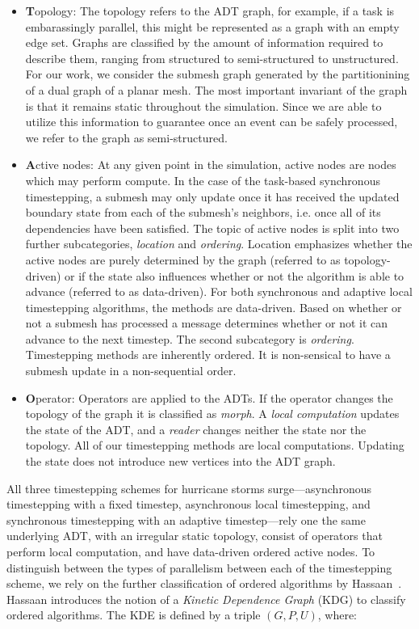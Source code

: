 \begin{itemize}
\item {\bf T}opology: The topology refers to the ADT graph, for example, if a task is embarassingly parallel, this might be represented as a graph with an empty edge set. Graphs are classified by the amount of information required to describe them, ranging from structured to semi-structured to unstructured. For our work, we consider the submesh graph generated by the partitionining of a dual graph of a planar mesh. The most important invariant of the graph is that it remains static throughout the simulation. Since we are able to utilize this information to guarantee once an event can be safely processed, we refer to the graph as semi-structured.
\item {\bf A}ctive nodes: At any given point in the simulation, active nodes are nodes which may perform  compute. In the case of the task-based synchronous timestepping, a submesh may only update once it has received the updated boundary state from each of the submesh's neighbors, i.e. once all of its dependencies have been satisfied. The topic of active nodes is split into two further subcategories, {\em location} and {\em ordering}. Location emphasizes whether the active nodes are purely determined by the graph (referred to as topology-driven) or if the state also influences whether or not the algorithm is able to advance (referred to as data-driven). For both synchronous and adaptive local timestepping algorithms, the methods are data-driven. Based on whether or not a submesh has processed a message determines whether or not it can advance to the next timestep. The second subcategory is {\em ordering}. Timestepping methods are inherently ordered. It is non-sensical to have a submesh update in a non-sequential order.
\item {\bf O}perator: Operators are applied to the ADTs. If the operator changes the topology of the graph it is classified as {\em morph}. A {\em local computation} updates the state of the ADT, and a {\em reader} changes neither the state nor the topology. All of our timestepping methods are local computations. Updating the state does not introduce new vertices into the ADT graph.
\end{itemize}
All three timestepping schemes for hurricane storms surge---asynchronous timestepping with a fixed timestep, asynchronous local timestepping, and synchronous timestepping with an adaptive timestep---rely one the same underlying ADT, with an irregular static topology, consist of operators that perform local computation, and have data-driven ordered active nodes. To distinguish between the types of parallelism between each of the timestepping scheme, we rely on the further classification of ordered algorithms by Hassaan~\cite{Hassaan2015, Hassaan2016}. Hassaan introduces the notion of a {\em Kinetic Dependence Graph} (KDG) to classify ordered algorithms. The KDE is defined by a triple $(G,P,U)$, where:
